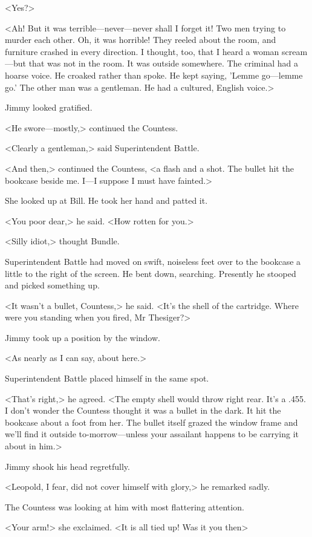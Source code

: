 <Yes?>

<Ah! But it was terrible—never—never shall I forget it! Two men trying to murder each other. Oh, it was horrible! They reeled about the room, and furniture crashed in every direction. I thought, too, that I heard a woman scream—but that was not in the room. It was outside somewhere. The criminal had a hoarse voice. He croaked rather than spoke. He kept saying, 'Lemme go—lemme go.' The other man was a gentleman. He had a cultured, English voice.>

Jimmy looked gratified.

<He swore—mostly,> continued the Countess.

<Clearly a gentleman,> said Superintendent Battle.

<And then,> continued the Countess, <a flash and a shot. The bullet hit the bookcase beside me. I—I suppose I must have fainted.>

She looked up at Bill. He took her hand and patted it.

<You poor dear,> he said. <How rotten for you.>

<Silly idiot,> thought Bundle.

Superintendent Battle had moved on swift, noiseless feet over to the bookcase a little to the right of the screen. He bent down, searching. Presently he stooped and picked something up.

<It wasn't a bullet, Countess,> he said. <It's the shell of the cartridge. Where were you standing when you fired, Mr Thesiger?>

Jimmy took up a position by the window.

<As nearly as I can say, about here.>

Superintendent Battle placed himself in the same spot.

<That's right,> he agreed. <The empty shell would throw right rear. It's a .455. I don't wonder the Countess thought it was a bullet in the dark. It hit the bookcase about a foot from her. The bullet itself grazed the window frame and we'll find it outside to-morrow—unless your assailant happens to be carrying it about in him.>

Jimmy shook his head regretfully.

<Leopold, I fear, did not cover himself with glory,> he remarked sadly.

The Countess was looking at him with most flattering attention.

<Your arm!> she exclaimed. <It is all tied up! Was it you then\longdash>

